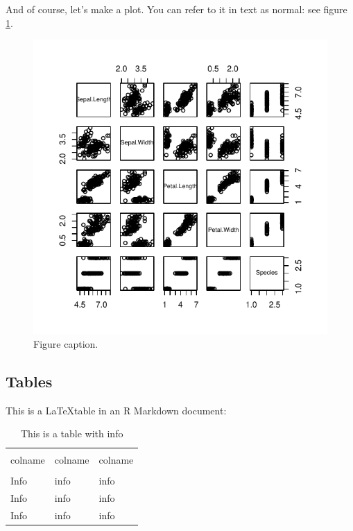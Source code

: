 \documentclass[
  12pt,
]{article}
\begin{document}
And of course, let's make a plot. You can refer to it in text as normal:
see figure \ref{irisgraph}.

\begin{figure}
\centering
\includegraphics{figures/unnamed-chunk-11-1.pdf}
\caption{Figure caption. \label{irisgraph}}
\end{figure}

\hypertarget{tables}{%
\subsection{Tables}\label{tables}}

This is a \LaTeX  table in an R Markdown document:

\begin{table}
\centering
\caption{This is a table with info}
\label{table-paramvalues}
\begin{tabular}{ p{4cm} p{4cm} p{4cm} }
\hline \\ [-1.5ex]
colname & colname & colname \\ [1ex]
\hline \\ [-1.5ex]
Info & info & info \\ [1ex]
Info & info & info \\ [1ex]
Info & info & info \\ [1ex]
\hline
\end{tabular}
\end{table}
\end{document}
